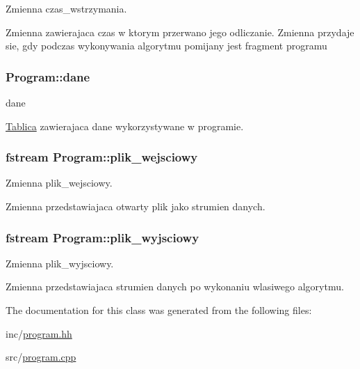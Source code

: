 Zmienna czas\+\_\+wstrzymania. 

Zmienna zawierajaca czas w ktorym przerwano jego odliczanie. Zmienna przydaje sie, gdy podczas wykonywania algorytmu pomijany jest fragment programu \hypertarget{class_program_ac27fc896de0e4c87cc6a17290c0930ef}{
\subsubsection[{dane}]{ Program\+::dane}}\label{class_program_ac27fc896de0e4c87cc6a17290c0930ef}


dane 

\hyperlink{class_tablica}{Tablica} zawierajaca dane wykorzystywane w programie. \hypertarget{class_program_a532ceacb1d70da66142bab96a3eb0753}{
\subsubsection[{plik\+\_\+wejsciowy}]{\setlength{\rightskip}{0pt plus 5cm}fstream Program\+::plik\+\_\+wejsciowy}}\label{class_program_a532ceacb1d70da66142bab96a3eb0753}


Zmienna plik\+\_\+wejsciowy. 

Zmienna przedstawiajaca otwarty plik jako strumien danych. \hypertarget{class_program_aaa305591a4333d799c8d353f3072d8e0}{
\subsubsection[{plik\+\_\+wyjsciowy}]{\setlength{\rightskip}{0pt plus 5cm}fstream Program\+::plik\+\_\+wyjsciowy}}\label{class_program_aaa305591a4333d799c8d353f3072d8e0}


Zmienna plik\+\_\+wyjsciowy. 

Zmienna przedstawiajaca strumien danych po wykonaniu wlasiwego algorytmu. 

The documentation for this class was generated from the following files\+:\begin{DoxyCompactItemize}
\item 
inc/\hyperlink{program_8hh}{program.\+hh}\item 
src/\hyperlink{program_8cpp}{program.\+cpp}\end{DoxyCompactItemize}
